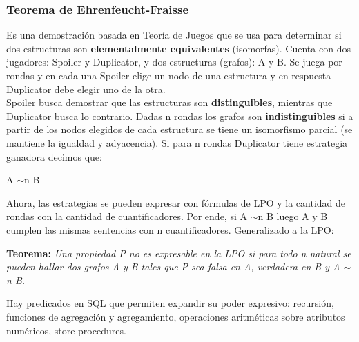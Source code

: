 \subsubsection*{Teorema de Ehrenfeucht-Fraisse}
Es una demostración basada en Teoría de Juegos que se usa para determinar si dos estructuras son \textbf{elementalmente equivalentes} (isomorfas). Cuenta con dos jugadores: Spoiler y Duplicator, y dos estructuras (grafos): A y B. Se juega por rondas y en cada una Spoiler elige un nodo de una estructura y en respuesta Duplicator debe elegir uno de la otra. \\
Spoiler busca demostrar que las estructuras son \textbf{distinguibles}, mientras que Duplicator busca lo contrario. Dadas n rondas los grafos son \textbf{indistinguibles} si a partir de los nodos elegidos de cada estructura se tiene un isomorfismo parcial (se mantiene la igualdad y adyacencia). Si para n rondas Duplicator tiene estrategia ganadora decimos que:
\begin{center}
    A $\sim$n B
\end{center}
Ahora, las estrategias se pueden expresar con fórmulas de LPO y la cantidad de rondas con la cantidad de cuantificadores. Por ende, si A $\sim$n B luego A y B cumplen las mismas sentencias con n cuantificadores. Generalizado a la LPO:

\textbf{Teorema:} \textit{Una propiedad P no es expresable en la LPO si para todo n natural se pueden hallar dos grafos A y B tales que P sea falsa en A, verdadera en B y A $\sim$n B.}

Hay predicados  en SQL que permiten expandir su poder expresivo: recursión, funciones de agregación y agregamiento, operaciones aritméticas sobre atributos numéricos, store procedures.
